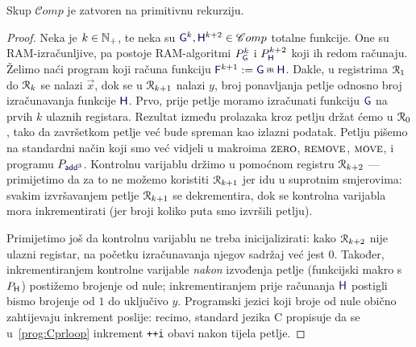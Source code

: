 \begin{lema}[{name=[zatvorenost skupa $\mathscr Comp$ na primitivnu rekurziju]}]\label{lm:prram}
Skup $\mathscr Comp$ je zatvoren na primitivnu rekurziju.
\end{lema}
\begin{proof}
Neka je $k\in{\mathbb N}_+$, te neka su $\f G^k,\f H^{k+2}\in\mathscr Comp$ totalne funkcije. One su RAM-izračunljive, pa postoje RAM-algoritmi $P_{\f G}^k$ i $P_{\f H}^{k+2}$ koji ih redom računaju. Želimo naći program koji računa funkciju $\f F^{k+1}:=\f G\pr\f H$. Dakle, u registrima $\mathcal R_{1}$ do $\mathcal R_{k}$ se nalazi $\vec x$, dok se u $\mathcal R_{k+1}$ nalazi $y$, broj ponavljanja petlje odnosno broj izračunavanja funkcije $\f H$. Prvo, prije petlje moramo izračunati funkciju $\f G$ na prvih $k$ ulaznih registara. Rezultat između prolazaka kroz petlju držat ćemo u $\mathcal R_{0}$, tako da završetkom petlje već bude spreman kao izlazni podatak. Petlju pišemo na standardni način koji smo već vidjeli u makroima $\textsc{zero}$, $\textsc{remove}$, $\textsc{move}$, i programu $P_{\f{add}^3}$. Kontrolnu varijablu držimo u pomoćnom registru $\mathcal R_{k+2}$ --- primijetimo da za to ne možemo koristiti $\mathcal R_{k+1}$ jer idu u suprotnim smjerovima: svakim izvršavanjem petlje $\mathcal R_{k+1}$ se dekrementira, dok se kontrolna varijabla mora inkrementirati (jer broji koliko puta smo izvršili petlju).

    Primijetimo još da kontrolnu varijablu ne treba inicijalizirati: kako $\mathcal R_{k+2}$ nije ulazni registar, na početku izračunavanja njegov sadržaj već jest $0$. Također, inkrementiranjem kontrolne varijable \emph{nakon} izvođenja petlje (funkcijski makro s $P_{\f H}$) postižemo brojenje od nule; inkrementiranjem prije računanja $\f H$ postigli bismo brojenje od $1$ do uključivo $y$. Programski jezici koji broje od nule obično zahtijevaju inkrement poslije: recimo, standard jezika C propisuje da se u~\eqref{prog:Cprloop} inkrement \texttt{++i} obavi nakon tijela petlje.


\end{proof}
